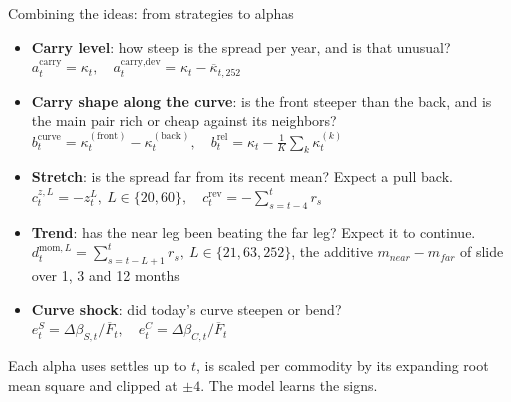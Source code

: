 \documentclass[10pt, aspectratio=169]{beamer}
\newcommand{\key}[1]{\textcolor{accent}{\textbf{#1}}}
\begin{document}
\begin{frame}{Combining the ideas: from strategies to alphas}
{\scriptsize
\begin{itemize}\setlength{\itemsep}{0pt}
  \item[A] \key{Carry level}: how steep is the spread per year, and is that
        unusual?\hfill
        $a^{\text{carry}}_t=\kappa_t,\quad
         a^{\text{carry,dev}}_t=\kappa_t-\overline{\kappa}_{t,252}$
  \item[B] \key{Carry shape along the curve}: is the front steeper than the
        back, and is the main pair rich or cheap against its neighbors?\\
        $b^{\text{curve}}_t=\kappa^{(\text{front})}_t-\kappa^{(\text{back})}_t,\quad
         b^{\text{rel}}_t=\kappa_t-\tfrac{1}{K}\textstyle\sum_k\kappa^{(k)}_t$
  \item[C] \key{Stretch}: is the spread far from its recent mean? Expect a pull
        back.\hfill
        $c^{z,L}_t=-z^{L}_t,\ L\in\{20,60\},\quad
         c^{\text{rev}}_t=-\textstyle\sum_{s=t-4}^{t}r_s$
  \item[D] \key{Trend}: has the near leg been beating the far leg? Expect it to
        continue.\\
        $d^{\text{mom},L}_t=\textstyle\sum_{s=t-L+1}^{t}r_s,\ L\in\{21,63,252\}$,
        the additive $m_{near}-m_{far}$ of slide~\pageref{sl:d} over 1, 3 and
        12 months
  \item[E] \key{Curve shock}: did today's curve steepen or bend?\hfill
        $e^{S}_t=\Delta\beta_{S,t}/\overline{F}_t,\quad
         e^{C}_t=\Delta\beta_{C,t}/\overline{F}_t$
\end{itemize}}
\vspace{-0.3ex}
{\scriptsize\color{slate}Each alpha uses settles up to $t$, is scaled per
commodity by its expanding root mean square and clipped at $\pm4$. The model
learns the signs.}
\end{frame}
\end{document}

